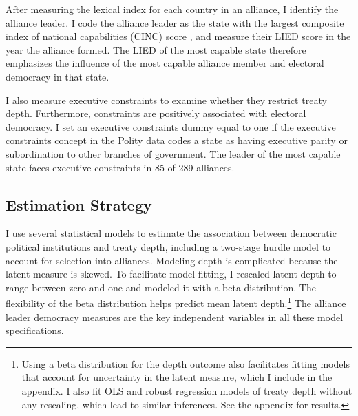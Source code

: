 \documentclass[12pt]{article}
\begin{document}
After measuring the lexical index for each country in an alliance, I identify the alliance leader.   
I code the alliance leader as the state with the largest composite index of national capabilities (CINC) score \citep{SingerCINC1988}, and measure their LIED score in the year the alliance formed.
The LIED of the most capable state therefore emphasizes the influence of the most capable alliance member and electoral democracy in that state.


I also measure executive constraints to examine whether they restrict treaty depth. 
Furthermore, constraints are positively associated with electoral democracy.
I set an executive constraints dummy equal to one if the executive constraints concept in the Polity data codes a state as having executive parity or subordination to other branches of government.
The leader of the most capable state faces executive constraints in 85 of 289 alliances.



\subsection{Estimation Strategy}



I use several statistical models to estimate the association between democratic political institutions and treaty depth, including a two-stage hurdle model to account for selection into alliances. 
Modeling depth is complicated because the latent measure is skewed.
To facilitate model fitting, I rescaled latent depth to range between zero and one and modeled it with a beta distribution.
The flexibility of the beta distribution helps predict mean latent depth.\footnote{Using a beta distribution for the depth outcome also facilitates fitting models that account for uncertainty in the latent measure, which I include in the appendix. I also fit OLS and robust regression models of treaty depth without any rescaling, which lead to similar inferences. See the appendix for results.} 
The alliance leader democracy measures are the key independent variables in all these model specifications. 
\end{document}

